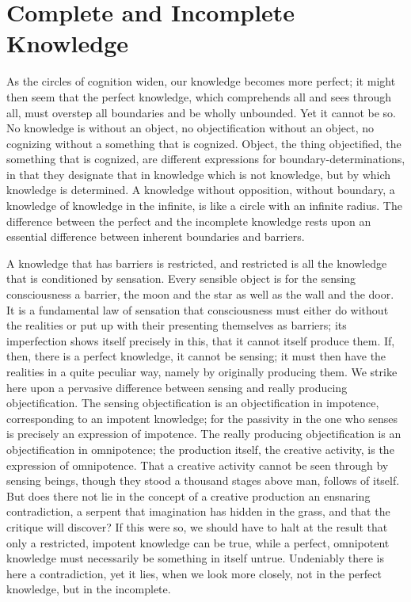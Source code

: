 \documentclass[12pt]{book}
\begin{document}
\section{Complete and Incomplete Knowledge}
\label{sec:7}

\noindent As the circles of cognition widen, our knowledge becomes more
perfect; it might then seem that the perfect knowledge, which comprehends all
and sees through all, must overstep all boundaries and be wholly unbounded. Yet
it cannot be so. No knowledge is without an object, no objectification without
an object, no cognizing without a something that is cognized. Object, the thing
objectified, the something that is cognized, are different expressions for
boundary-determinations, in that they designate that in knowledge which is not
knowledge, but by which knowledge is determined. A knowledge without
opposition, without boundary, a knowledge of knowledge in the infinite, is like
a circle with an infinite radius. The difference between the perfect and the
incomplete knowledge rests upon an essential difference between inherent
boundaries and barriers.

A knowledge that has barriers is restricted, and restricted is all the
knowledge that is conditioned by sensation. Every sensible object is for the
sensing consciousness a barrier, the moon and the star as well as the wall and
the door. It is a fundamental law of sensation that consciousness must either
do without the realities or put up with their presenting themselves as
barriers; its imperfection shows itself precisely in this, that it cannot
itself produce them. If, then, there is a perfect knowledge, it cannot be
sensing; it must then have the realities in a quite peculiar way, namely by
originally producing them. We strike here upon a pervasive difference between
sensing and really producing objectification. The sensing objectification is an
objectification in impotence, corresponding to an impotent knowledge; for the
passivity in the one who senses is precisely an expression of impotence. The
really producing objectification is an objectification in omnipotence; the
production itself, the creative activity, is the expression of omnipotence. That
a creative activity cannot be seen through by sensing beings, though they stood
a thousand stages above man, follows of itself. But does there not lie in the
concept of a creative production an ensnaring contradiction, a serpent that
imagination has hidden in the grass, and that the critique will discover? If
this were so, we should have to halt at the result that only a restricted,
impotent knowledge can be true, while a perfect, omnipotent knowledge must
necessarily be something in itself untrue. Undeniably there is here a
contradiction, yet it lies, when we look more closely, not in the perfect
knowledge, but in the incomplete.
\end{document}
